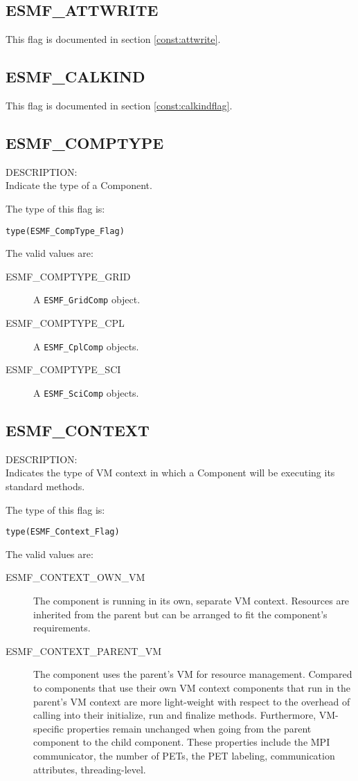\subsection{ESMF\_ATTWRITE}
This flag is documented in section \ref{const:attwrite}.


\subsection{ESMF\_CALKIND}
This flag is documented in section \ref{const:calkindflag}.


\subsection{ESMF\_COMPTYPE}
\label{const:comptype}
{\sf DESCRIPTION:\\}
Indicate the type of a Component.

The type of this flag is:

{\tt type(ESMF\_CompType\_Flag)}

The valid values are:
\begin{description}
	\item[ESMF\_COMPTYPE\_GRID]
	A {\tt ESMF\_GridComp} object. 
	\item[ESMF\_COMPTYPE\_CPL]
	A {\tt ESMF\_CplComp} objects.
	\item[ESMF\_COMPTYPE\_SCI]
	A {\tt ESMF\_SciComp} objects.
\end{description}


\subsection{ESMF\_CONTEXT}
\label{const:contextflag}
{\sf DESCRIPTION:\\}  
Indicates the type of VM context in which a Component will be executing its
standard methods.

The type of this flag is:

{\tt type(ESMF\_Context\_Flag)}

The valid values are:
\begin{description}

\item [ESMF\_CONTEXT\_OWN\_VM]
         The component is running in its own, separate VM context. Resources
         are inherited from the parent but can be arranged to fit the
         component's requirements.
\item [ESMF\_CONTEXT\_PARENT\_VM]
         The component uses the parent's VM for resource management. Compared
         to components that use their own VM context components that run in the
         parent's VM context are more light-weight with respect to the overhead
         of calling into their initialize, run and finalize methods.
         Furthermore, VM-specific properties remain unchanged when going from
         the parent component to the child component. These properties include
         the MPI communicator, the number of PETs, the PET labeling, 
         communication attributes, threading-level.
\end{description}



